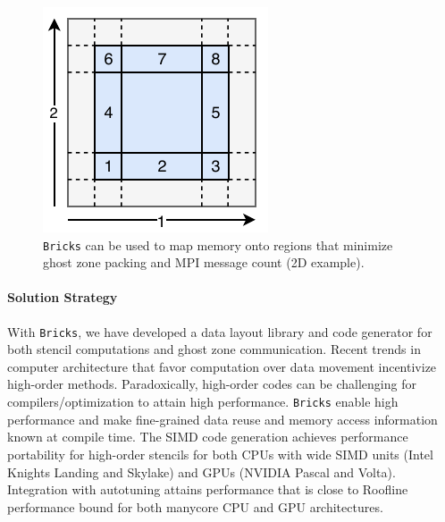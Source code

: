 \begin{figure}
\begin{center}
  \includegraphics[trim=3mm 5mm 3mm 8mm,width=.33\textwidth]{projects/2.3.2-Tools/2.3.2.10-PROTEAS-YTUNE/Bricks-mpi-parts.pdf}
\end{center}
  \caption{\texttt{Bricks} can be used to map memory onto regions that
  minimize ghost zone packing and MPI message count (2D example).}
\end{figure}

\paragraph{Solution Strategy}
With \texttt{Bricks}, we have developed a data layout library and code 
  generator for both stencil computations and ghost zone communication.
Recent trends in computer architecture that favor computation over data 
  movement incentivize high-order methods.
Paradoxically, high-order codes can be challenging for compilers/optimization 
  to attain high performance.  
\texttt{Bricks} enable high performance and make fine-grained data reuse and 
  memory access information known at compile time.  
The SIMD code generation achieves performance portability
  for high-order stencils for both CPUs with wide SIMD units (Intel Knights
  Landing and Skylake) and GPUs (NVIDIA Pascal and Volta).  
Integration with autotuning attains performance that is close to Roofline
  performance bound for both manycore CPU and GPU architectures.


